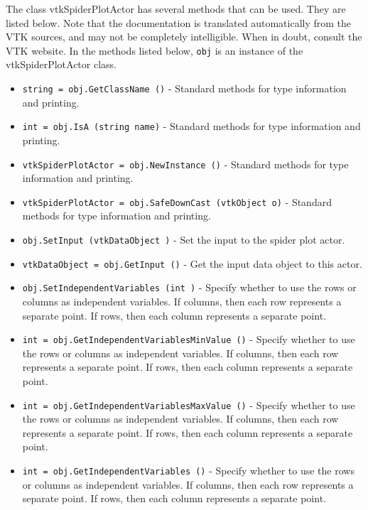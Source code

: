 The class vtkSpiderPlotActor has several methods that can be used.
  They are listed below.
Note that the documentation is translated automatically from the VTK sources,
and may not be completely intelligible.  When in doubt, consult the VTK website.
In the methods listed below, \verb|obj| is an instance of the vtkSpiderPlotActor class.
\begin{itemize}
\item  \verb|string = obj.GetClassName ()| -  Standard methods for type information and printing.

\item  \verb|int = obj.IsA (string name)| -  Standard methods for type information and printing.

\item  \verb|vtkSpiderPlotActor = obj.NewInstance ()| -  Standard methods for type information and printing.

\item  \verb|vtkSpiderPlotActor = obj.SafeDownCast (vtkObject o)| -  Standard methods for type information and printing.

\item  \verb|obj.SetInput (vtkDataObject )| -  Set the input to the spider plot actor.

\item  \verb|vtkDataObject = obj.GetInput ()| -  Get the input data object to this actor.

\item  \verb|obj.SetIndependentVariables (int )| -  Specify whether to use the rows or columns as independent variables.
 If columns, then each row represents a separate point. If rows, then 
 each column represents a separate point.

\item  \verb|int = obj.GetIndependentVariablesMinValue ()| -  Specify whether to use the rows or columns as independent variables.
 If columns, then each row represents a separate point. If rows, then 
 each column represents a separate point.

\item  \verb|int = obj.GetIndependentVariablesMaxValue ()| -  Specify whether to use the rows or columns as independent variables.
 If columns, then each row represents a separate point. If rows, then 
 each column represents a separate point.

\item  \verb|int = obj.GetIndependentVariables ()| -  Specify whether to use the rows or columns as independent variables.
 If columns, then each row represents a separate point. If rows, then 
 each column represents a separate point.


\end{itemize}
